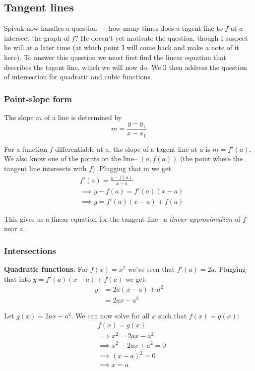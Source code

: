 \subsection{Tangent lines}
Spivak now handles a question---- how many times does a tagent line to
$f$ at $a$ intersect the graph of $f$? He doesn't yet motivate the
question, though I suspect he will at a later time (at which point I
will come back and make a note of it here). To answer this question we
must first find the linear equation that describes the tagent line,
which we will now do. We'll then address the question of intersection
for quadratic and cubic functions.

\subsubsection*{Point-slope form}
The slope $m$ of a line is determined by
\[m=\frac{y-y_1}{x-x_1}\]

For a function $f$ differentiable at $a$, the slope of a tagent line
at $a$ is $m=f'(a)$. We also know one of the points on the line--
$(a, f(a))$ (the point where the tangent line intersects with $f$).
Plugging that in we get
\begin{align*}
  &f'(a)=\frac{y-f(a)}{x-a}\\
  &\implies y-f(a)=f'(a)(x-a)\\
  &\implies y=f'(a)(x-a)+f(a)
\end{align*}

This gives us a linear equation for the tangent line-- a \textit{linear
  approximation} of $f$ near $a$.

\subsubsection*{Intersections}

\textbf{Quadratic functions.} For $f(x)=x^2$ we've seen that
$f'(a)=2a$. Plugging that into $y=f'(a)(x-a)+f(a)$ we get:
\begin{align*}
  y&=2a(x-a)+a^2\\
   &=2ax-a^2
\end{align*}

Let $g(x)=2ax-a^2$. We can now solve for all $x$ such that
$f(x)=g(x)$:
\begin{align*}
  &f(x)=g(x)\\
  &\implies x^2=2ax-a^2\\
  &\implies x^2-2ax+a^2=0\\
  &\implies (x-a)^2=0\\
  &\implies x=a
\end{align*}

